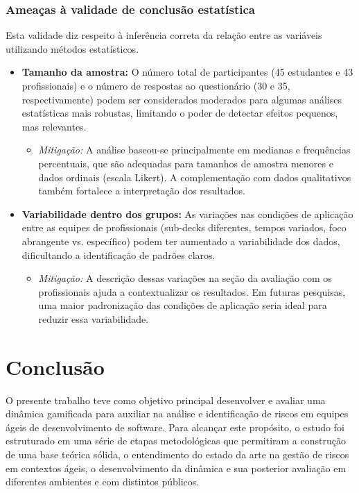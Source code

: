 \documentclass[
	12pt,
	openright,
	twoside,
	a4paper,
	english,
	brazil
	]{abntex2}
\begin{document}
\subsection{Ameaças à validade de conclusão estatística}
\label{sec:ameacas-estatistica}

Esta validade diz respeito à inferência correta da relação entre as variáveis utilizando métodos estatísticos.

\begin{itemize}
  \item \textbf{Tamanho da amostra:} O número total de participantes (45 estudantes e 43 profissionais) e o número de respostas ao questionário (30 e 35, respectivamente) podem ser considerados moderados para algumas análises estatísticas mais robustas, limitando o poder de detectar efeitos pequenos, mas relevantes.
    \begin{itemize}
    \item \textit{Mitigação:} A análise baseou-se principalmente em medianas e frequências percentuais, que são adequadas para tamanhos de amostra menores e dados ordinais (escala Likert). A complementação com dados qualitativos também fortalece a interpretação dos resultados.
    \end{itemize}
  \item \textbf{Variabilidade dentro dos grupos:} As variações nas condições de aplicação entre as equipes de profissionais (sub-decks diferentes, tempos variados, foco abrangente vs. específico) podem ter aumentado a variabilidade dos dados, dificultando a identificação de padrões claros.
    \begin{itemize}
    \item \textit{Mitigação:} A descrição dessas variações na seção da avaliação com os profissionais ajuda a contextualizar os resultados. Em futuras pesquisas, uma maior padronização das condições de aplicação seria ideal para reduzir essa variabilidade.
    \end{itemize}
\end{itemize}


\chapter{Conclusão}

O presente trabalho teve como objetivo principal desenvolver e avaliar uma dinâmica gamificada para auxiliar na análise e identificação de riscos em equipes ágeis de desenvolvimento de software. Para alcançar este propósito, o estudo foi estruturado em uma série de etapas metodológicas que permitiram a construção de uma base teórica sólida, o entendimento do estado da arte na gestão de riscos em contextos ágeis, o desenvolvimento da dinâmica e sua posterior avaliação em diferentes ambientes e com distintos públicos.
\end{document}
